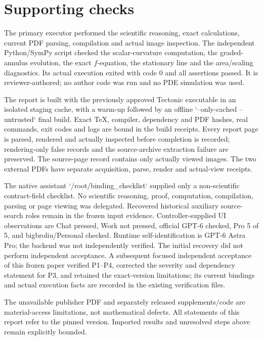 \documentclass[10pt]{article}
\begin{document}
\section*{Supporting checks}
The primary executor performed the scientific reasoning, exact calculations, current PDF parsing, compilation and actual image inspection. The independent Python/SymPy script checked the scalar-curvature computation, the graded-annulus evolution, the exact \(f\)-equation, the stationary line and the area/scaling diagnostics. Its actual execution exited with code 0 and all assertions passed. It is reviewer-authored; no author code was run and no PDE simulation was used.\par
The report is built with the previously approved Tectonic executable in an isolated staging cache, with a warm-up followed by an offline `–only-cached –untrusted` final build. Exact TeX, compiler, dependency and PDF hashes, real commands, exit codes and logs are bound in the build receipts. Every report page is parsed, rendered and actually inspected before completion is recorded; rendering-only false records and the source-archive extraction failure are preserved. The source-page record contains only actually viewed images. The two external PDFs have separate acquisition, parse, render and actual-view receipts.\par
The native assistant `/root/binding\_checklist` supplied only a non-scientific contract-field checklist. No scientific reasoning, proof, computation, compilation, parsing or page viewing was delegated. Recovered historical auxiliary source-search roles remain in the frozen input evidence. Controller-supplied UI observations are Chat pressed, Work not pressed, official GPT-6 checked, Pro 5 of 5, and bigbroliu/Personal checked. Runtime self-identification is GPT-6 Astra Pro; the backend was not independently verified. The initial recovery did not perform independent acceptance. A subsequent focused independent acceptance of this frozen paper verified P1–P4, corrected the severity and dependency statement for P3, and retained the exact-version limitations; its current bindings and actual execution facts are recorded in the existing verification files.\par
The unavailable publisher PDF and separately released supplements/code are material-access limitations, not mathematical defects. All statements of this report refer to the pinned version. Imported results and unresolved steps above remain explicitly bounded.\par
\end{document}
